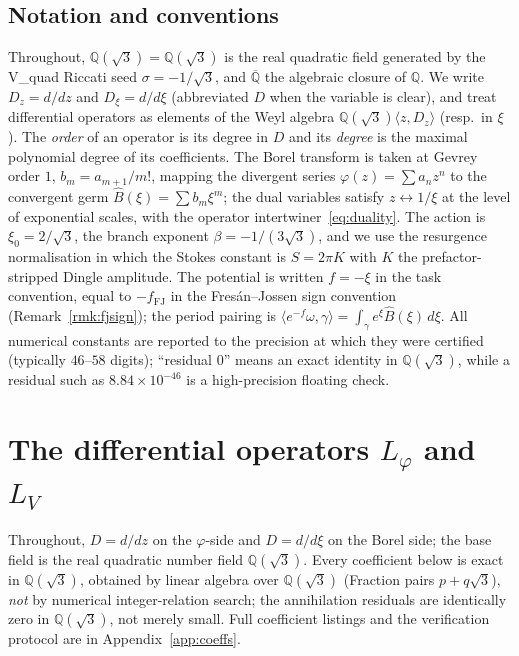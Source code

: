 \documentclass[11pt,reqno]{amsart}
\theoremstyle{plain}
\theoremstyle{definition}
\newcommand{\Bhat}{\widehat{B}}
\newcommand{\Lphi}{L_{\varphi}}
\newcommand{\LV}{L_{V}}
\newcommand{\Qsqrt}{\mathbb{Q}(\sqrt3)}
\newcommand{\Qbar}{\overline{\mathbb{Q}}}
\newcommand{\xizero}{\xi_0}
\begin{document}
\subsection{Notation and conventions}
Throughout, $\Qsqrt=\mathbb{Q}(\sqrt3)$ is the real quadratic field generated by the V\_quad
Riccati seed $\sigma=-1/\sqrt3$, and $\Qbar$ the algebraic closure of $\mathbb{Q}$. We write
$D_z=d/dz$ and $D_\xi=d/d\xi$ (abbreviated $D$ when the variable is clear), and treat differential
operators as elements of the Weyl algebra $\Qsqrt\langle z,D_z\rangle$ (resp.\ in $\xi$). The
\emph{order} of an operator is its degree in $D$ and its \emph{degree} is the maximal polynomial
degree of its coefficients. The Borel transform is taken at Gevrey order $1$, $b_m=a_{m+1}/m!$,
mapping the divergent series $\varphi(z)=\sum a_nz^n$ to the convergent germ
$\Bhat(\xi)=\sum b_m\xi^m$; the dual variables satisfy $z\leftrightarrow1/\xi$ at the level of
exponential scales, with the operator intertwiner~\eqref{eq:duality}. The action is
$\xizero=2/\sqrt3$, the branch exponent $\beta=-1/(3\sqrt3)$, and we use the resurgence
normalisation in which the Stokes constant is $S=2\pi K$ with $K$ the prefactor-stripped Dingle
amplitude. The potential is written $f=-\xi$ in the task convention, equal to $-f_{\mathrm{FJ}}$ in
the Fres\'an--Jossen sign convention (Remark~\ref{rmk:fjsign}); the period pairing is
$\langle e^{-f}\omega,\gamma\rangle=\int_\gamma e^{\xi}\Bhat(\xi)\,d\xi$. All numerical constants
are reported to the precision at which they were certified (typically $46$--$58$ digits);
``residual $0$'' means an exact identity in $\Qsqrt$, while a residual such as
$8.84\times10^{-46}$ is a high-precision floating check.

\section{The differential operators \texorpdfstring{$\Lphi$}{Lphi} and \texorpdfstring{$\LV$}{LV}}\label{sec:operators}

Throughout, $D=d/dz$ on the $\varphi$-side and $D=d/d\xi$ on the Borel side; the base field is
the real quadratic number field $\Qsqrt$. Every coefficient below is exact in $\Qsqrt$, obtained
by linear algebra over $\Qsqrt$ (Fraction pairs $p+q\sqrt3$), \emph{not} by numerical
integer-relation search; the annihilation residuals are identically zero in $\Qsqrt$, not merely
small. Full coefficient listings and the verification protocol are in
Appendix~\ref{app:coeffs}.
\end{document}
